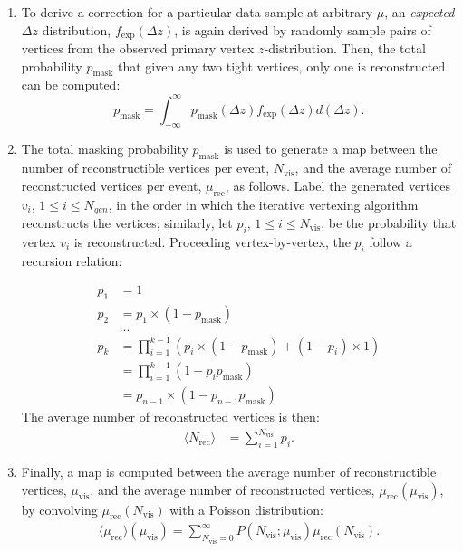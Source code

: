 \begin{enumerate}
	\item To derive a correction for a particular data sample at arbitrary $\mu$, an \emph{expected} $\Delta z$ distribution, $f_{\mathrm{exp}}(\Delta z)$, is again derived by randomly sample pairs of vertices from the observed primary vertex $z$-distribution. Then, the total probability $p_{\textrm{mask}}$ that given any two tight vertices, only one is reconstructed can be computed: 
	\begin{equation}
		p_{\textrm{mask}} = \int_{-\infty}^{\infty} p_{\textrm{mask}}(\Delta z) f_{\mathrm{exp}}(\Delta z) d(\Delta z).
	\end{equation}
	
	\item The total masking probability $p_{\textrm{mask}}$ is used to generate a map between the number of reconstructible vertices per event, $N_{\textrm{vis}}$, and the average number of reconstructed vertices per event, $\mu_{\textrm{rec}}$, as follows. Label the generated vertices $v_i$, $1 \leq i \leq N_{gen}$, in the order in which the iterative vertexing algorithm reconstructs the vertices; similarly, let $p_i$, $1\leq i \leq N_{\textrm{vis}}$, be the probability that vertex $v_i$ is reconstructed. Proceeding vertex-by-vertex, the $p_i$ follow a recursion relation:

	\begin{align}
		p_1 &= 1\\
		p_2 &= p_1 \times (1 - p_{\textrm{mask}})\\
		&... \\
		p_k &= \prod_{i=1}^{k-1} \left( p_i  \times (1-p_{\textrm{mask}}) + (1-p_i) \times 1\right)\\
		&= \prod_{i=1}^{k-1} \left(1 - p_i p_{\textrm{mask}}\right)\\
		&= p_{n-1} \times \left(1-p_{n-1} p_{\textrm{mask}}\right)
	\end{align}
	The average number of reconstructed vertices is then:
	\begin{align}
		\langle N_{\textrm{rec}} \rangle &= \sum_{i=1}^{N_{\textrm{vis}}} p_i.
	\end{align}
	
	\item Finally, a map is computed between the average number of reconstructible vertices, $\mu_{\textrm{vis}}$, and the average number of reconstructed vertices, $ \mu_{\textrm{rec}}(\mu_{\textrm{vis}})$, by convolving $\mu_{\textrm{rec}}(N_{\textrm{vis}})$ with a Poisson distribution:
	\begin{align}
		\langle \mu_{\textrm{rec}} \rangle (\mu_{\textrm{vis}}) = \sum_{N_{\textrm{vis}}=0}^{\infty} P(N_{\textrm{vis}}; \mu_{\textrm{vis}}) \mu_{\textrm{rec}} (N_{\textrm{vis}}).
	\end{align}
\end{enumerate}

